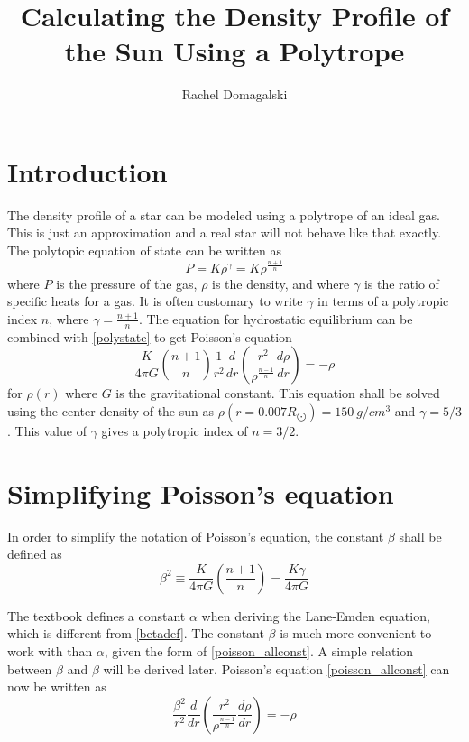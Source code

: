 \documentclass[11pt,letterpaper]{article}
\title{Calculating the Density Profile of the Sun Using a Polytrope}
\author{Rachel Domagalski}
\date{}
\begin{document}
\maketitle

\section{Introduction}

The density profile of a star can be modeled using a polytrope of an ideal gas.
This is just an approximation and a real star will not behave like that exactly.
The polytopic equation of state can be written as \cite{textbook}
\begin{equation}
    P = K \rho^\gamma = K \rho^{\frac{n+1}{n}}
    \label{polystate}
\end{equation}
where $P$ is the pressure of the gas, $\rho$ is the density, and where $\gamma$
is the ratio of specific heats for a gas. It is often customary to write
$\gamma$ in terms of a polytropic index $n$, where $\gamma = \frac{n+1}{n}$. The
equation for hydrostatic equilibrium can be combined with
\eqref{polystate} to get Poisson's equation
\begin{equation}
    \frac{K}{4\pi G}\left(\frac{n+1}{n}\right)\frac{1}{r^2}\frac{d}{dr}
    \left(\frac{r^2}{\rho^{\frac{n-1}{n}}}\frac{d\rho}{dr}\right) = -\rho
    \label{poisson_allconst}
\end{equation}
for $\rho\left(r\right)$ where $G$ is the gravitational constant. This equation
shall be solved using the center density of the sun as
$\rho\left(r = 0.007 R_{\bigodot} \right) = 150 \ g/cm^3$ and $\gamma = 5/3$.
This value of $\gamma$ gives a polytropic index of $n = 3/2$.

\section{Simplifying Poisson's equation}

In order to simplify the notation of Poisson's equation, the constant $\beta$
shall be defined as
\begin{equation}
    \beta^2 \equiv \frac{K}{4\pi G}\left(\frac{n+1}{n}\right) = 
    \frac{K \gamma}{4\pi G}
    \label{betadef}
\end{equation}

The textbook defines a constant $\alpha$ when deriving the Lane-Emden equation,
which is different from \eqref{betadef}. The constant $\beta$ is much more
convenient to work with than $\alpha$, given the form of
\eqref{poisson_allconst}. A simple relation between $\beta$ and $\beta$ will be
derived later. Poisson's equation \eqref{poisson_allconst} can now be written as
\begin{equation}
    \frac{\beta^2}{r^2}\frac{d}{dr}
    \left(\frac{r^2}{\rho^{\frac{n-1}{n}}}\frac{d\rho}{dr}\right) = -\rho
    \label{poisson_eq}
\end{equation}
\end{document}
